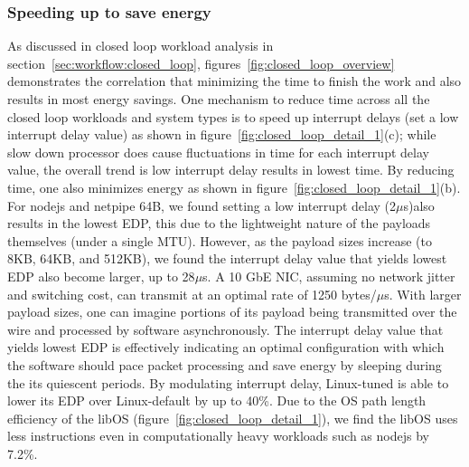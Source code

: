 
\subsubsection{Speeding up to save energy}
As discussed in closed loop workload analysis in section~\ref{sec:workflow:closed_loop}, figures~\ref{fig:closed_loop_overview} demonstrates the correlation that minimizing the time to finish the work and also results in most energy savings. One mechanism to reduce time across all the closed loop workloads and system types is to speed up interrupt delays (set a low interrupt delay value) as shown in figure~\ref{fig:closed_loop_detail_1}(c); while slow down processor does cause fluctuations in time for each interrupt delay value, the overall trend is low interrupt delay results in lowest time. By reducing time, one also minimizes energy as shown in figure~\ref{fig:closed_loop_detail_1}(b). For nodejs and netpipe 64B, we found setting a low interrupt delay (2$\mu$s)also results in the lowest EDP, this due to the lightweight nature of the payloads themselves (under a single MTU). However, as the payload sizes increase (to 8KB, 64KB, and 512KB), we found the interrupt delay value that yields lowest EDP also become larger, up to 28$\mu$s. A 10 GbE NIC, assuming no network jitter and switching cost, can transmit at an optimal rate of 1250 bytes/$\mu$s. With larger payload sizes, one can imagine portions of its payload being transmitted over the wire and processed by software asynchronously. The interrupt delay value that yields lowest EDP is effectively indicating an optimal configuration with which the software should pace packet processing and save energy by sleeping during the its quiescent periods. By modulating interrupt delay, Linux-tuned is able to lower its EDP over Linux-default by up to 40\%. Due to the OS path length efficiency of the libOS (figure~\ref{fig:closed_loop_detail_1}), we find the libOS uses less instructions even in computationally heavy workloads such as nodejs by 7.2\%.  


